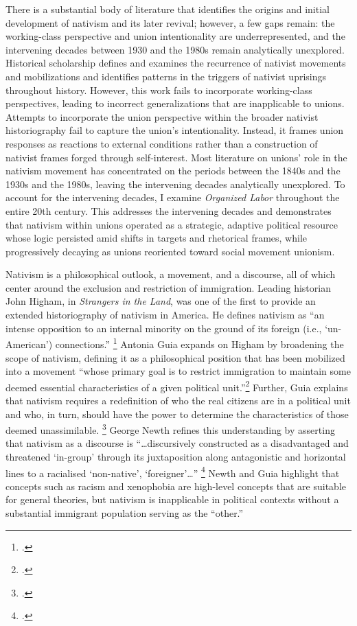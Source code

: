\documentclass[12pt,a4paper]{article}
\begin{document}
There is a substantial body of literature that identifies the origins and initial development of nativism and its later revival; however, a few gaps remain: the working-class perspective and union intentionality are underrepresented, and the intervening decades between 1930 and the 1980s remain analytically unexplored. Historical scholarship defines and examines the recurrence of nativist movements and mobilizations and identifies patterns in the triggers of nativist uprisings throughout history. However, this work fails to incorporate working-class perspectives, leading to incorrect generalizations that are inapplicable to unions. Attempts to incorporate the union perspective within the broader nativist historiography fail to capture the union’s intentionality. Instead, it frames union responses as reactions to external conditions rather than a construction of nativist frames forged through self-interest. Most literature on unions' role in the nativism movement has concentrated on the periods between the 1840s and the 1930s and the 1980s, leaving the intervening decades analytically unexplored. To account for the intervening decades, I examine \textit{Organized Labor} throughout the entire 20th century. This addresses the intervening decades and demonstrates that nativism within unions operated as a strategic, adaptive political resource whose logic persisted amid shifts in targets and rhetorical frames, while progressively decaying as unions reoriented toward social movement unionism.

Nativism is a philosophical outlook, a movement, and a discourse, all of which center around the exclusion and restriction of immigration. Leading historian John Higham, in \textit{Strangers in the Land}, was one of the first to provide an extended historiography of nativism in America. He defines nativism as ``an intense opposition to an internal minority on the ground of its foreign (i.e., `un-American') connections.'' \footcite[4]{higham_strangers_1955} Antonia Guia expands on Higham by broadening the scope of nativism, defining it as a philosophical position that has been mobilized into a movement ``whose primary goal is to restrict immigration to maintain some deemed essential characteristics of a given political unit.''\footcite{guia_concept_nodate} Further, Guia explains that nativism requires a redefinition of who the real citizens are in a political unit and who, in turn, should have the power to determine the characteristics of those deemed unassimilable. \footcite[15]{guia_concept_nodate} George Newth refines this understanding by asserting that nativism as a discourse is ``\ldots discursively constructed as a disadvantaged and threatened `in-group' through its juxtaposition along antagonistic and horizontal lines to a racialised `non-native', `foreigner'\ldots'' \footcite{newth_rethinking_2021} Newth and Guia highlight that concepts such as racism and xenophobia are high-level concepts that are suitable for general theories, but nativism is inapplicable in political contexts without a substantial immigrant population serving as the ``other.''
\end{document}

